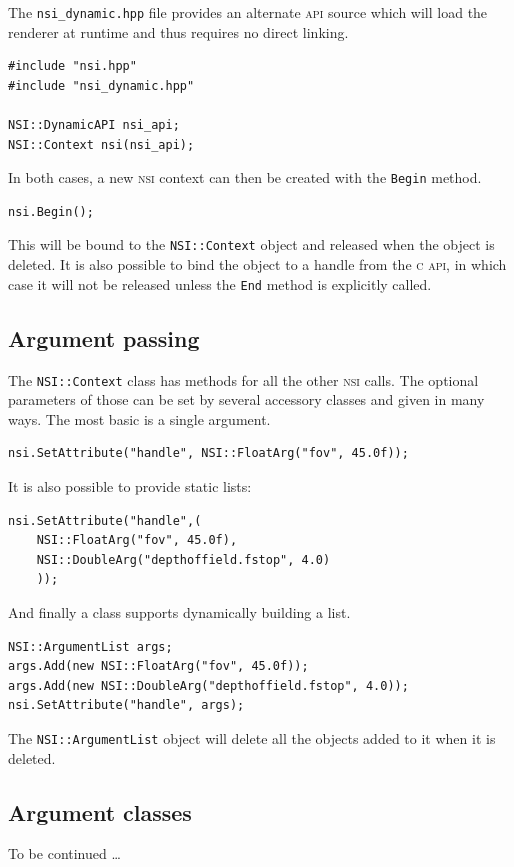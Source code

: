\documentclass[oneside,ebook]{memoir}
\newcommand*{\acronym}[1]{\textsc{\lowercase{#1}}}
\begin{document}
\label{dynamicapi}
The \lstinline|nsi_dynamic.hpp| file provides an alternate \acronym{API} source which will load the renderer at runtime and thus requires no direct linking.
\begin{lstlisting}
#include "nsi.hpp"
#include "nsi_dynamic.hpp"

NSI::DynamicAPI nsi_api;
NSI::Context nsi(nsi_api);
\end{lstlisting}

In both cases, a new \acronym{NSI} context can then be created with the \lstinline|Begin| method.
\begin{lstlisting}
nsi.Begin();
\end{lstlisting}

This will be bound to the \lstinline|NSI::Context| object and released when the object is deleted. It is also possible to bind the object to a handle from the \acronym{C} \acronym{API}, in which case it will not be released unless the \lstinline|End| method is explicitly called.

\subsection{Argument passing}
The \lstinline|NSI::Context| class has methods for all the other \acronym{NSI} calls. The optional parameters of those can be set by several accessory classes and given in many ways. The most basic is a single argument.
\begin{lstlisting}
nsi.SetAttribute("handle", NSI::FloatArg("fov", 45.0f));
\end{lstlisting}

It is also possible to provide static lists:
\begin{lstlisting}
nsi.SetAttribute("handle",(
    NSI::FloatArg("fov", 45.0f),
    NSI::DoubleArg("depthoffield.fstop", 4.0)
    ));
\end{lstlisting}

And finally a class supports dynamically building a list.
\begin{lstlisting}
NSI::ArgumentList args;
args.Add(new NSI::FloatArg("fov", 45.0f));
args.Add(new NSI::DoubleArg("depthoffield.fstop", 4.0));
nsi.SetAttribute("handle", args);
\end{lstlisting}

The \lstinline|NSI::ArgumentList| object will delete all the objects added to it when it is deleted.

\subsection{Argument classes}
To be continued \ldots
\end{document}
